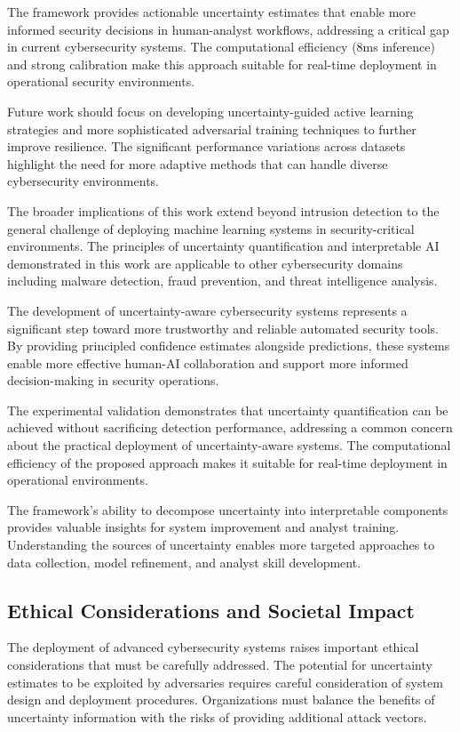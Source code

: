 \documentclass[journal]{IEEEtran}
\begin{document}
The framework provides actionable uncertainty estimates that enable more informed security decisions in human-analyst workflows, addressing a critical gap in current cybersecurity systems. The computational efficiency (8ms inference) and strong calibration make this approach suitable for real-time deployment in operational security environments.

Future work should focus on developing uncertainty-guided active learning strategies and more sophisticated adversarial training techniques to further improve resilience. The significant performance variations across datasets highlight the need for more adaptive methods that can handle diverse cybersecurity environments.

The broader implications of this work extend beyond intrusion detection to the general challenge of deploying machine learning systems in security-critical environments. The principles of uncertainty quantification and interpretable AI demonstrated in this work are applicable to other cybersecurity domains including malware detection, fraud prevention, and threat intelligence analysis.

The development of uncertainty-aware cybersecurity systems represents a significant step toward more trustworthy and reliable automated security tools. By providing principled confidence estimates alongside predictions, these systems enable more effective human-AI collaboration and support more informed decision-making in security operations.

The experimental validation demonstrates that uncertainty quantification can be achieved without sacrificing detection performance, addressing a common concern about the practical deployment of uncertainty-aware systems. The computational efficiency of the proposed approach makes it suitable for real-time deployment in operational environments.

The framework's ability to decompose uncertainty into interpretable components provides valuable insights for system improvement and analyst training. Understanding the sources of uncertainty enables more targeted approaches to data collection, model refinement, and analyst skill development.

\subsection{Ethical Considerations and Societal Impact}

The deployment of advanced cybersecurity systems raises important ethical considerations that must be carefully addressed. The potential for uncertainty estimates to be exploited by adversaries requires careful consideration of system design and deployment procedures. Organizations must balance the benefits of uncertainty information with the risks of providing additional attack vectors.
\end{document}
